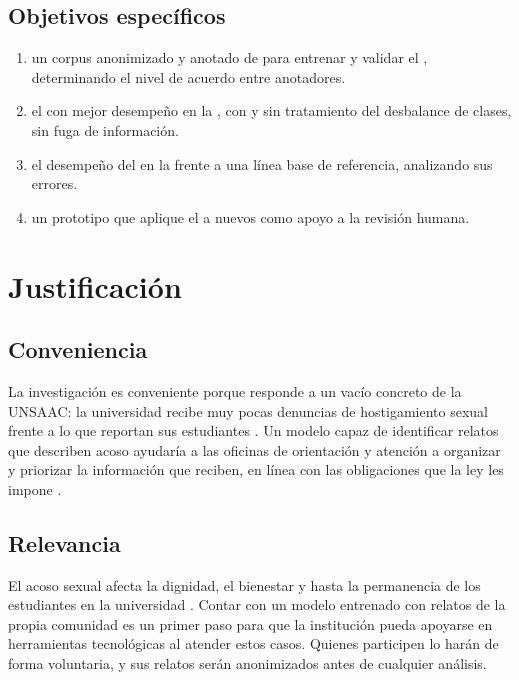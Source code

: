 \subsection{Objetivos específicos}
\begin{enumerate}[label=OE\arabic*:, leftmargin=1.6cm]
	\item {} un corpus anonimizado y anotado de  para entrenar y validar el , determinando el nivel de acuerdo entre anotadores.
	\item {} el  con mejor desempeño en la , con y sin tratamiento del desbalance de clases, sin fuga de información.
	\item {} el desempeño del  en la  frente a una línea base de referencia, analizando sus errores.
	\item {} un prototipo que aplique el  a nuevos  como apoyo a la revisión humana.
\end{enumerate}

\section{Justificación}

\subsection{Conveniencia}
La investigación es conveniente porque responde a un vacío concreto de la UNSAAC: la universidad recibe muy pocas denuncias de hostigamiento sexual frente a lo que reportan sus estudiantes \citep{gutierrez2022}. Un modelo capaz de identificar relatos que describen acoso ayudaría a las oficinas de orientación y atención a organizar y priorizar la información que reciben, en línea con las obligaciones que la ley les impone \citep{ley27942, ds0142019}.

\subsection{Relevancia}
El acoso sexual afecta la dignidad, el bienestar y hasta la permanencia de los estudiantes en la universidad \citep{bondestam2020}. Contar con un modelo entrenado con relatos de la propia comunidad es un primer paso para que la institución pueda apoyarse en herramientas tecnológicas al atender estos casos. Quienes participen lo harán de forma voluntaria, y sus relatos serán anonimizados antes de cualquier análisis.

